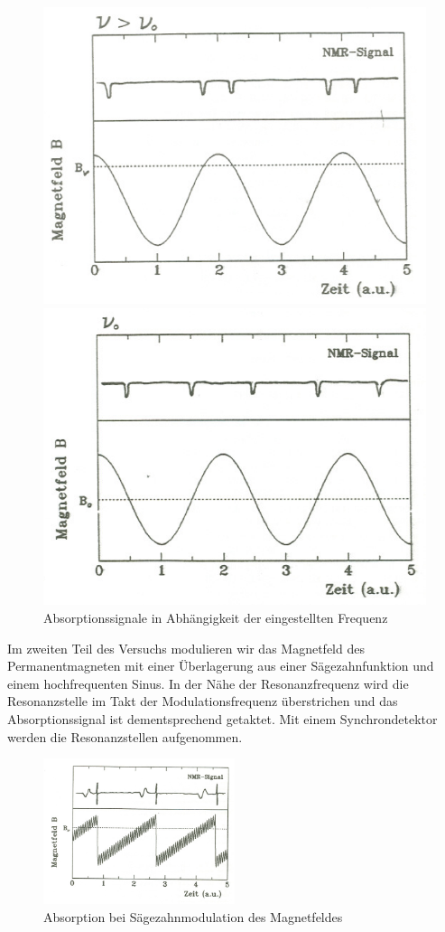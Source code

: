 \begin{figure}[H]
\begin{minipage}{0.49\textwidth}
\centering \includegraphics[width=\textwidth]{Bilder/vb1.png}
\end{minipage}
\begin{minipage}{0.49\textwidth}
\centering \includegraphics[width=\textwidth]{Bilder/vb2.png}
\end{minipage}
\caption{Absorptionssignale in Abhängigkeit der eingestellten Frequenz}
\end{figure}

Im zweiten Teil des Versuchs modulieren wir das Magnetfeld des Permanentmagneten mit einer Überlagerung aus einer Sägezahnfunktion und einem hochfrequenten Sinus. In der Nähe der Resonanzfrequenz wird die Resonanzstelle im Takt der Modulationsfrequenz überstrichen und das Absorptionssignal ist dementsprechend getaktet. Mit einem Synchrondetektor werden die Resonanzstellen aufgenommen.

\begin{figure}[H]
\centering \includegraphics[width=0.5\textwidth]{Bilder/vb3.png}
\caption{Absorption bei Sägezahnmodulation des Magnetfeldes}
\end{figure}